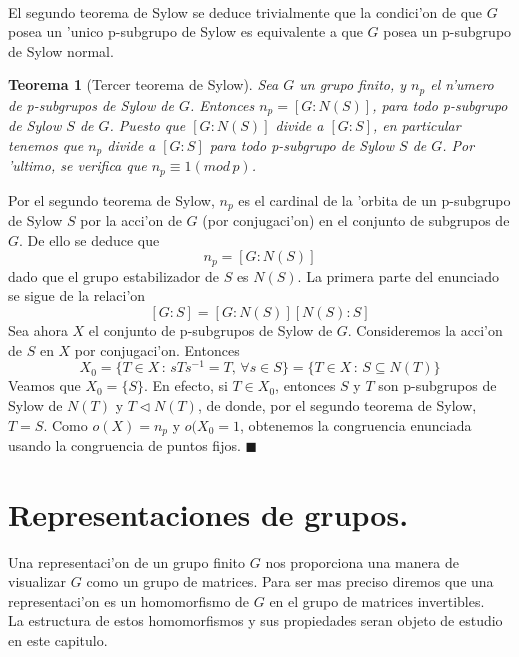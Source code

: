 \documentclass[a4paper,openright,12pt]{report}
\numberwithin{equation}{section} %
\newtheorem{teorema}{Teorema}[section] %
\newenvironment{proof}{\noindent{\it Demostracion:}}{\hfill$\blacksquare$} %
\begin{document}
\\
El segundo teorema de Sylow se deduce trivialmente que la condici'on de que $G$ posea un 'unico p-subgrupo de Sylow es equivalente a que $G$ posea un p-subgrupo de Sylow normal.
\begin{teorema}[Tercer teorema de Sylow]
Sea $G$ un grupo finito, y $n_{p}$ el n'umero de p-subgrupos de Sylow de $G$. Entonces $n_{p}=[G:N(S)]$, para todo p-subgrupo de Sylow $S$ de $G$. Puesto que $[G:N(S)]$ divide a $[G:S]$, en particular tenemos que $n_{p}$ divide a $[G:S]$ para todo p-subgrupo de Sylow $S$ de $G$. Por 'ultimo, se verifica que $n_{p} \equiv 1(mod \, p)$.
\end{teorema}
\begin{proof}
Por el segundo teorema de Sylow, $n_{p}$ es el cardinal de la 'orbita de un p-subgrupo de Sylow $S$ por la acci'on de $G$ (por conjugaci'on) en el conjunto de subgrupos de $G$. De ello se deduce que
\[
n_{p}=[G:N(S)]
\]
dado que el grupo estabilizador de $S$ es $N(S)$. La primera parte del enunciado se sigue de la relaci'on
\[
[G:S]=[G:N(S)][N(S):S]
\]
Sea ahora $X$ el conjunto de p-subgrupos de Sylow de $G$. Consideremos la acci'on de $S$ en $X$ por conjugaci'on. Entonces
\[
X_{0}=\{ T \in X \, : \, sTs^{-1}=T, \, \forall s \in S \} = \{T \in X \, : \, S \subseteq N(T) \}
\]
Veamos que $X_{0}=\{ S \}$. En efecto, si $T \in X_{0}$, entonces $S$ y $T$ son p-subgrupos de Sylow de $N(T)$ y $T \triangleleft N(T)$, de donde, por el segundo teorema de Sylow, $T=S$. Como $o(X)=n_{p}$ y $o(X_{0}=1$, obtenemos la congruencia enunciada usando la congruencia de puntos fijos.
\end{proof}
\chapter{Representaciones de grupos.}
Una representaci'on de un grupo finito $G$ nos proporciona una manera de visualizar $G$ como un grupo de matrices. Para ser mas preciso diremos que una representaci'on es un homomorfismo de $G$ en el grupo de matrices invertibles.\\
La estructura de estos homomorfismos y sus propiedades seran objeto de estudio en este capitulo.   
\end{document}
